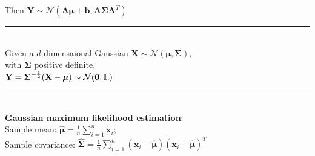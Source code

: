 \documentclass[10pt,landscape]{article}
\makeatletter
\renewcommand{\section}{\@startsection{section}{1}{\z@}{3ex}{2ex}
                       {\normalfont\large\bfseries\textit}}
\newcommand{\bb}{\mathbf{b}}
\newcommand{\bx}{\mathbf{x}}
\newcommand{\bA}{\mathbf{A}}
\newcommand{\bI}{\mathbf{I}}
\newcommand{\bX}{\mathbf{X}}
\newcommand{\bY}{\mathbf{Y}}
\newcommand{\bmu}{\boldsymbol{\mu}}
\newcommand{\bSigma}{\boldsymbol{\Sigma}}
\newcommand{\tp}[1]{#1^{T}}
\newcommand{\gaussian}[2]{\mathcal{N}(#1, #2)}
\newcommand{\ruler}{\\\rule{\columnwidth}{0.25pt}\\}
\makeatother
\begin{document}
\begin{multicols*}{3}
Then $\bY \sim \gaussian{\bA\bmu + \bb}{\bA\bSigma\tp{\bA}}$
\ruler
Given a $d$-dimensaional Gaussian $\bX \sim \gaussian{\bmu}{\bSigma}$,\\
with $\bSigma$ positive definite,\\
$\bY = \bSigma^{-\frac{1}{2}}(\bX-\bmu) \sim \gaussian{\mathbf{0}, \bI}$
\ruler
\textbf{Gaussian maximum likelihood estimation}:\\
Sample mean: $\hat{\bmu} = \frac{1}{n}\sum_{i=1}^{n}\bx_i$;\\
Sample covariance: $\hat{\bSigma} = \frac{1}{n}\sum_{i=1}^{n}(\bx_i - \hat{\bmu})\tp{(\bx_i - \hat{\bmu})}$

\end{multicols*}
\end{document}
